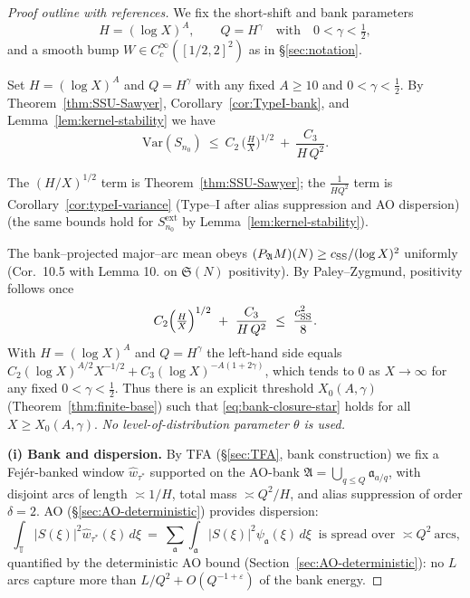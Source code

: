 \begin{proof}[Proof outline with references]
We fix the short-shift and bank parameters
\begin{equation}\label{eq:params-choice}
H=(\log X)^A,\qquad Q=H^\gamma\quad\text{with}\quad 0<\gamma<\tfrac12,
\end{equation}
and a smooth bump $W\in C_c^\infty([1/2,2]^2)$ as in \S\ref{sec:notation}. 

Set $H=(\log X)^A$ and $Q=H^\gamma$ with any fixed $A\ge 10$ and $0<\gamma<\tfrac12$. 
By Theorem~\ref{thm:SSU-Sawyer}, Corollary~\ref{cor:TypeI-bank}, and Lemma~\ref{lem:kernel-stability} we have
\[
\mathrm{Var}(S_{n_0})\ \le\ 
C_2\,\Big(\tfrac{H}{X}\Big)^{1/2}
\ +\ \frac{C_3}{H\,Q^2}.
\]

\noindent The $(H/X)^{1/2}$ term is Theorem~\ref{thm:SSU-Sawyer}; the $\frac{1}{H Q^2}$ term is Corollary~\ref{cor:typeI-variance} (Type--I after alias suppression and AO dispersion) (the same bounds hold for $S^{\mathrm{ext}}_{n_0}$ by Lemma~\ref{lem:kernel-stability}).

The bank--projected major--arc mean obeys $(P_{\mathfrak A}M)(N)\ge c_{\rm SS}/(\log X)^2$ uniformly (Cor.~10.5 with Lemma 10.\* on $\mathfrak S(N)$ positivity). 
By Paley--Zygmund, positivity follows once
\begin{equation}\label{eq:bank-closure-star}
C_2\Big(\tfrac{H}{X}\Big)^{1/2}\ +\ \frac{C_3}{H\,Q^2}\ \le\ \frac{c_{\rm SS}^2}{8}.
\end{equation}
With $H=(\log X)^A$ and $Q=H^\gamma$ the left-hand side equals 
$C_2(\log X)^{A/2}X^{-1/2} + C_3(\log X)^{-A(1+2\gamma)}$, which tends to $0$ as $X\to\infty$ for any fixed $0<\gamma<\tfrac12$.
Thus there is an explicit threshold $X_0(A,\gamma)$ (Theorem~\ref{thm:finite-base}) such that \eqref{eq:bank-closure-star} holds for all $X\ge X_0(A,\gamma)$. 
\emph{No level-of-distribution parameter $\theta$ is used.}

\smallskip
\noindent\textbf{(i) Bank and dispersion.}
By TFA (\S\ref{sec:TFA}, bank construction) we fix a Fejér-banked window $\widehat w_{\tau^\ast}$ supported on the AO-bank $\mathfrak A=\bigcup_{q\le Q}\mathfrak a_{a/q}$, with disjoint arcs of length $\asymp 1/H$, total mass $\asymp Q^2/H$, and alias suppression of order $\delta=2$. AO (\S\ref{sec:AO-deterministic}) provides dispersion:
\[
\int_{\mathbb T}\! |S(\xi)|^2\widehat w_{\tau^\ast}(\xi)\,d\xi
\ =\ \sum_{\mathfrak a}\int_{\mathfrak a}\! |S(\xi)|^2\psi_{\mathfrak a}(\xi)\,d\xi
\ \text{ is spread over }\asymp Q^2\ \text{arcs,}
\]
quantified by the deterministic AO bound (Section~\ref{sec:AO-deterministic}): no $L$ arcs capture more than $L/Q^2 + O(Q^{-1+\varepsilon})$ of the bank energy.


\end{proof}
